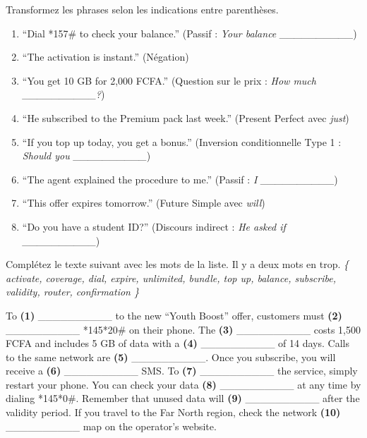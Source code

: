 \documentclass[11pt]{article}
\begin{document}
\begin{exercice}
Transformez les phrases selon les indications entre parenthèses.
\begin{enumerate}
\item ``Dial *157\# to check your balance.'' (Passif : \emph{Your balance \_\_\_\_\_\_\_\_\_\_})
\item ``The activation is instant.'' (Négation)
\item ``You get 10 GB for 2,000 FCFA.'' (Question sur le prix : \emph{How much \_\_\_\_\_\_\_\_\_\_?})
\item ``He subscribed to the Premium pack last week.'' (Present Perfect avec \emph{just})
\item ``If you top up today, you get a bonus.'' (Inversion conditionnelle Type 1 : \emph{Should you \_\_\_\_\_\_\_\_\_\_})
\item ``The agent explained the procedure to me.'' (Passif : \emph{I \_\_\_\_\_\_\_\_\_\_})
\item ``This offer expires tomorrow.'' (Future Simple avec \emph{will})
\item ``Do you have a student ID?'' (Discours indirect : \emph{He asked if \_\_\_\_\_\_\_\_\_\_})
\end{enumerate}
\end{exercice}

\begin{exercice}
Complétez le texte suivant avec les mots de la liste. Il y a deux mots en trop.
\emph{\{ activate, coverage, dial, expire, unlimited, bundle, top up, balance, subscribe, validity, router, confirmation \}}
\begin{textebox}[Complétion]
To \textbf{(1)} \_\_\_\_\_\_\_\_\_\_ to the new ``Youth Boost'' offer, customers must \textbf{(2)} \_\_\_\_\_\_\_\_\_\_ *145*20\# on their phone. The \textbf{(3)} \_\_\_\_\_\_\_\_\_\_ costs 1,500 FCFA and includes 5 GB of data with a \textbf{(4)} \_\_\_\_\_\_\_\_\_\_ of 14 days. Calls to the same network are \textbf{(5)} \_\_\_\_\_\_\_\_\_\_. Once you subscribe, you will receive a \textbf{(6)} \_\_\_\_\_\_\_\_\_\_ SMS. To \textbf{(7)} \_\_\_\_\_\_\_\_\_\_ the service, simply restart your phone. You can check your data \textbf{(8)} \_\_\_\_\_\_\_\_\_\_ at any time by dialing *145*0\#. Remember that unused data will \textbf{(9)} \_\_\_\_\_\_\_\_\_\_ after the validity period. If you travel to the Far North region, check the network \textbf{(10)} \_\_\_\_\_\_\_\_\_\_ map on the operator's website.
\end{textebox}
\end{exercice}
\end{document}
